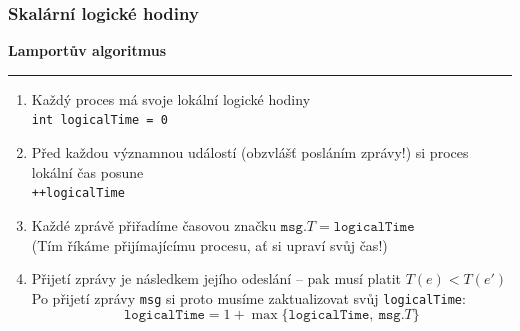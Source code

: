 \documentclass[usenames,dvipsnames,9pt]{beamer}
\begin{document}
\begin{frame}
  \frametitle{Skalární logické hodiny}

  \begin{center}
    \LARGE {\bf Lamportův algoritmus}
  \end{center}

  \vspace{1em}\hrule\vspace{1em}

  \begin{enumerate}
  	\pause\item Každý proces má svoje lokální logické hodiny \\
  	            \texttt{int logicalTime = 0}
  	\pause\item Před každou významnou událostí (obzvlášť posláním zprávy!) si proces lokální čas posune \\
  				\texttt{++logicalTime}
  	\pause\item Každé zprávě přiřadíme časovou značku $\texttt{msg.}T = \texttt{logicalTime}$ \\
  				{\small (Tím říkáme přijímajícímu procesu, ať si upraví svůj čas!)}
  	\pause\item Přijetí zprávy je následkem jejího odeslání -- pak musí platit $T(e) < T(e')$ \\
  				Po přijetí zprávy \texttt{msg} si proto musíme zaktualizovat svůj \texttt{logicalTime}:
  				\[ \texttt{logicalTime} = 1 + \max \lbrace \texttt{logicalTime},\ \texttt{msg.}T \rbrace \]
  \end{enumerate}




\end{frame}
\end{document}
